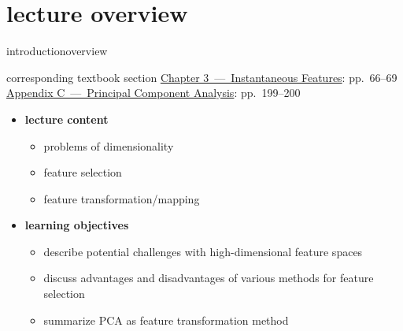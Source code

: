 




\subtitle{Module 3.5: Feature Dimensionality Reduction}


	

    \section[overview]{lecture overview}
        \begin{frame}{introduction}{overview}
            \begin{block}{corresponding textbook section}
                    \href{http://ieeexplore.ieee.org/xpl/articleDetails.jsp?arnumber=6331120}{Chapter 3~---~Instantaneous Features}: pp.~66--69\\
                    \href{http://ieeexplore.ieee.org/xpl/articleDetails.jsp?arnumber=6331116}{Appendix C~---~Principal Component Analysis}: pp.~199--200
                    
            \end{block}

            \begin{itemize}
                \item   \textbf{lecture content}
                    \begin{itemize}
                        \item   problems of dimensionality
                        \item   feature selection
                        \item   feature transformation/mapping
                    \end{itemize}
                \bigskip
                \item<2->   \textbf{learning objectives}
                    \begin{itemize}
                        \item   describe potential challenges with high-dimensional feature spaces
                        \item   discuss advantages and disadvantages of various methods for feature selection
                        \item   summarize PCA as feature transformation method
                    \end{itemize}
            \end{itemize}
        \end{frame}

